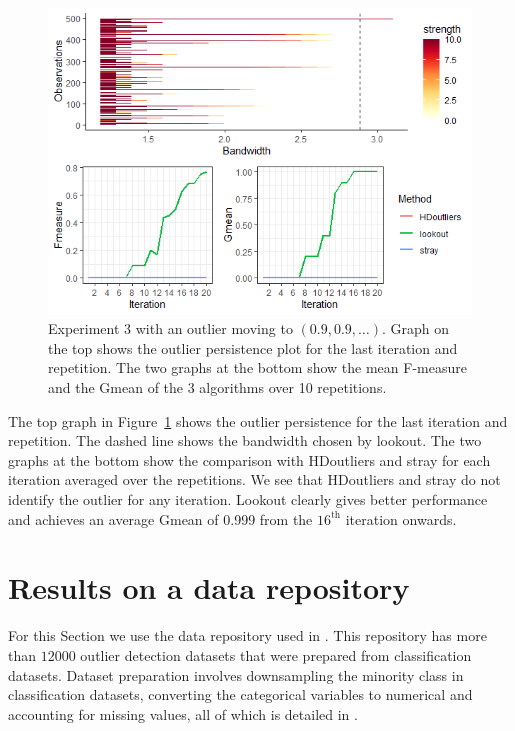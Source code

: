 \documentclass[letter,12pt]{article}
\begin{document}
\begin{figure}[!ht]
    \centering
    \includegraphics[scale=0.8]{Graphics/Comparison_Ex3.png}
    \caption{Experiment 3 with an outlier moving to $(0.9, 0.9, \ldots)$. Graph on the top shows the outlier persistence plot for the last iteration and repetition. The  two graphs at the bottom show the mean F-measure and the Gmean of the 3 algorithms over 10 repetitions. }
    \label{fig:ComparisonEx3}
\end{figure}

The top graph in Figure~\ref{fig:ComparisonEx3} shows the outlier persistence for the last iteration and repetition. The dashed line shows the bandwidth chosen by lookout. The two graphs at the bottom show the comparison with HDoutliers and stray for each iteration averaged over the repetitions. We see that HDoutliers and stray do not identify the outlier for any iteration. Lookout clearly gives better performance and achieves an average Gmean of 0.999  from the $16^{\text{th}}$ iteration onwards. 
\section{Results on  a data repository}\label{sec:applications}
For this Section we use the data repository used in \cite{datasets}. This repository has more than $12000$ outlier detection datasets that were prepared from classification datasets. Dataset preparation involves downsampling the minority class in classification datasets, converting the categorical variables to  numerical and accounting for missing values, all of which is detailed in \cite{normalizationoutliers} . 
\end{document}
